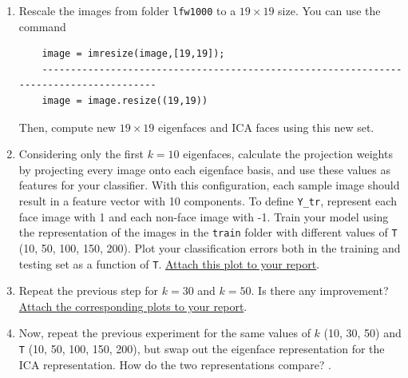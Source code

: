 \begin{enumerate}
    \item Rescale the images from folder \texttt{lfw1000} to a $19 \times 19$ size. You can use the command 
    \begin{lstlisting}
    image = imresize(image,[19,19]);
    ---------------------------------------------------------------------------------------
    image = image.resize((19,19))
    \end{lstlisting}
    Then, compute new $19 \times 19$ eigenfaces and ICA faces using this new set.
    
    \item Considering only the first $k = 10$ eigenfaces, calculate the projection weights by projecting every image onto each eigenface basis, and use these values as features for your classifier. With this configuration, each sample image should result in a feature vector with 10 components.
    To define \texttt{Y\_tr}, represent each face image with 1 and each non-face image with -1. Train your model using the representation of the images in the \texttt{train} folder with different values of \texttt{T} (10, 50, 100, 150, 200). Plot your classification errors both in the training and testing set as a function of \texttt{T}. \ul{Attach this plot to your report}.

    \item Repeat the previous step for $k = 30$ and $k = 50$. Is there any improvement? \ul{Attach the corresponding plots to your report}.
    
    \item Now, repeat the previous experiment for the same values of $k$ (10, 30, 50) and \texttt{T} (10, 50, 100, 150, 200), but swap out the eigenface representation for the ICA representation. How do the two representations compare? .
\end{enumerate}



    
